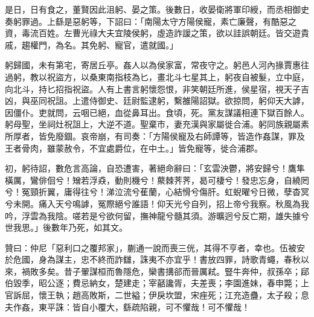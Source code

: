 \begin{pinyinscope}
是日，日有食之，董賢因此沮躬、晏之策。後數日，收晏衛將軍印綬，而丞相御史奏躬罪過。上繇是惡躬等，下詔曰：「南陽太守方陽侯寵，素亡廉聲，有酷惡之資，毒流百姓。左曹光祿大夫宜陵侯躬，虛造詐諼之策，欲以詿誤朝廷。皆交遊貴戚，趨權門，為名。其免躬、寵官，遣就國。」

躬歸國，未有第宅，寄居丘亭。姦人以為侯家富，常夜守之。躬邑人河內掾賈惠往過躬，教以祝盜方，以桑東南指枝為匕，畫北斗七星其上，躬夜自被髮，立中庭，向北斗，持匕招指祝盜。人有上書言躬懷怨恨，非笑朝廷所進，侯星宿，視天子吉凶，與巫同祝詛。上遣侍御史、廷尉監逮躬，繫雒陽詔獄。欲掠問，躬仰天大謼，因僵仆。吏就問，云咽已絕，血從鼻耳出。食頃，死。黨友謀議相連下獄百餘人。躬母聖，坐祠灶祝詛上，大逆不道。聖棄市，妻充漢與家屬徙合浦。躬同族親屬素所厚者，皆免廢錮。哀帝崩，有司奏：「方陽侯寵及右師譚等，皆造作姦謀，罪及王者骨肉，雖蒙赦令，不宜處爵位，在中土。」皆免寵等，徙合浦郡。

初，躬待詔，數危言高論，自恐遭害，著絕命辭曰：「玄雲泱鬱，將安歸兮！鷹隼橫厲，鸞俳佪兮！矰若浮猋，動則機兮！藂棘荠荠，曷可棲兮！發忠忘身，自繞罔兮！冤頸折翼，庸得往兮！涕泣流兮萑蘭，心結愲兮傷肝。虹蜺曜兮日微，孽杳冥兮未開。痛入天兮鳴謼，冤際絕兮誰語！仰天光兮自列，招上帝兮我察。秋風為我吟，浮雲為我陰。嗟若是兮欲何留，撫神龍兮髓其須。游曠迥兮反亡期，雄失據兮世我思。」後數年乃死，如其文。

贊曰：仲尼「惡利口之覆邦家」，蒯通一說而喪三侊，其得不亨者，幸也。伍被安於危國，身為謀主，忠不終而詐讎，誅夷不亦宜乎！書放四罪，詩歌青蠅，春秋以來，禍敗多矣。昔子翬謀桓而魯隱危，欒書搆郤而晉厲弒。豎牛奔仲，叔孫卒；郈伯毀季，昭公逐；費忌納女，楚建走；宰嚭讒胥，夫差喪；李園進妹，春申斃；上官訴屈，懷王執；趙高敗斯，二世縊；伊戾坎盟，宋痤死；江充造蠱，太子殺；息夫作姦，東平誅：皆自小覆大，繇疏陷親，可不懼哉！可不懼哉！


\end{pinyinscope}